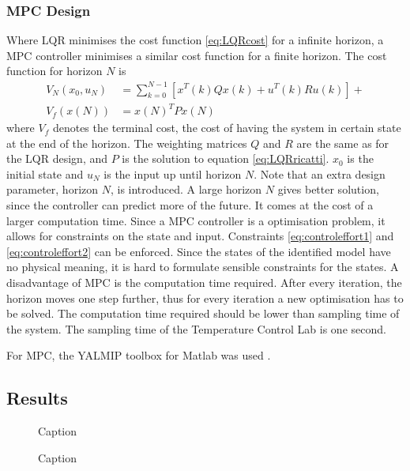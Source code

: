 \subsubsection{MPC Design}
Where LQR minimises the cost function \ref{eq:LQRcost} for a infinite horizon, a MPC controller minimises a similar cost function for a finite horizon. The cost function for horizon $N$ is
\begin{align}
    V_N(x_0,u_N) &= \sum_{k=0}^{N-1}[x^T(k)Qx(k) + u^T(k)Ru(k)] +  \label{eq:MPCcost}\\
    V_f(x(N)) &= x(N)^TPx(N) \nonumber
\end{align}
where $V_f$ denotes the terminal cost, the cost of having the system in certain state at the end of the horizon. The weighting matrices $Q$ and $R$ are the same as for the LQR design, and $P$ is the solution to equation \ref{eq:LQRricatti}. $x_0$ is the initial state and $u_N$ is the input up until horizon $N$. Note that an extra design parameter, horizon $N$, is introduced. A large horizon $N$ gives better solution, since the controller can predict more of the future. It comes at the cost of a larger computation time.
Since a MPC controller is a optimisation problem, it allows for constraints on the state and input. Constraints \ref{eq:controleffort1} and \ref{eq:controleffort2} can be enforced. Since the states of the identified model have no physical meaning, it is hard to formulate sensible constraints for the states.
A disadvantage of MPC is the computation time required. After every iteration, the horizon moves one step further, thus for every iteration a new optimisation has to be solved. The computation time required should be lower than sampling time of the system. The sampling time of the Temperature Control Lab is one second.

For MPC, the YALMIP toolbox for Matlab was used \cite{Lofberg2004}.

\subsection{Results}

\begin{figure}
    \centering
    
    \caption{Caption}
    \label{fig:my_label}
\end{figure}

\begin{figure}
    \centering
    
    \caption{Caption}
    \label{fig:my_label}
\end{figure}